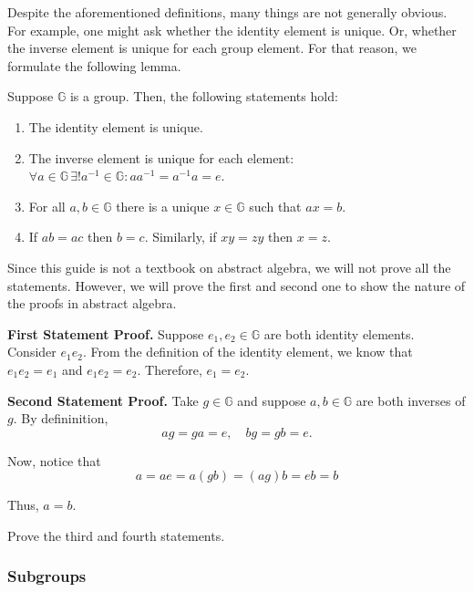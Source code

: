 \documentclass[../lecture-notes.tex]{subfiles}
\begin{document}
Despite the aforementioned definitions, many things are not generally obvious. For example, one might ask whether the identity element is unique. Or, 
whether the inverse element is unique for each group element. For that reason, we formulate the following lemma.

\begin{lemma}
    Suppose $\mathbb{G}$ is a group. Then, the following statements hold:
    \begin{enumerate}
        \item The identity element is unique.
        \item The inverse element is unique for each element: $\forall a \in \mathbb{G} \, \exists! a^{-1} \in \mathbb{G}: aa^{-1} = a^{-1}a = e$.
        \item For all $a,b \in \mathbb{G}$ there is a unique $x \in \mathbb{G}$ such that $ax = b$.
        \item If $ab=ac$ then $b=c$. Similarly, if $xy=zy$ then $x=z$.
    \end{enumerate}
\end{lemma}

Since this guide is not a textbook on abstract algebra, we will not prove all the statements. However, we will prove the first and second one to show the nature of the proofs in abstract algebra.

\textbf{First Statement Proof.} Suppose $e_1,e_2 \in \mathbb{G}$ are both identity elements. Consider $e_1e_2$. From the definition of the identity element, we know that $e_1e_2 = e_1$ and $e_1e_2 = e_2$. Therefore, $e_1 = e_2$.

\textbf{Second Statement Proof.} Take $g \in \mathbb{G}$ and suppose $a,b \in \mathbb{G}$ are both inverses of $g$. By defininition,
\begin{equation}
    ag = ga = e, \quad bg = gb = e.
\end{equation}

Now, notice that
\begin{equation}
    a = ae = a (gb) = (a g) b = e b = b
\end{equation}

Thus, $a = b$.

\begin{exercise}
    Prove the third and fourth statements.
\end{exercise}

\subsubsection{Subgroups}
\end{document}
